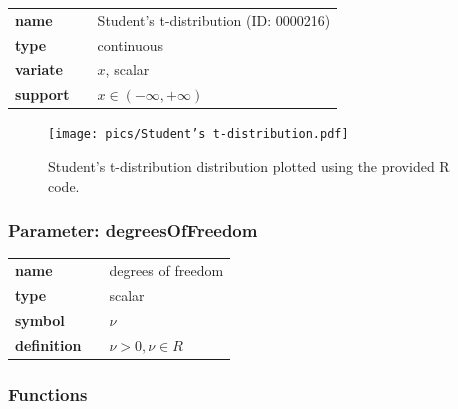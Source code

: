 \documentclass{article}
\begin{document}
  \bigskip 

\begin{tabular}{p{2cm}cl}
\textbf{name} & & Student's t-distribution (ID: 0000216)\\ 
 
\textbf{type} & & continuous \\ 

\textbf{variate} & & $x$, scalar \\ 

\textbf{support} & & $x \in (-\infty,+\infty)$
\end{tabular}

\begin{figure}[ht!]
\centering
  \texttt{[image: pics/Student's t-distribution.pdf]}
 \caption{Student's t-distribution distribution plotted using the provided R code.}
 \label{fig:Student's t-distribution}
\end{figure}

\subsubsection*{Parameter: degreesOfFreedom}

\noindent\begin{tabular}{p{2cm}cl}
\textbf{name} & & degrees of freedom \\
\textbf{type} & & scalar \\
\textbf{symbol} & & $\nu$  \\
\textbf{definition} & & $\nu > 0, \nu \in  R$
\end{tabular}
\subsubsection*{Functions}
\end{document}
